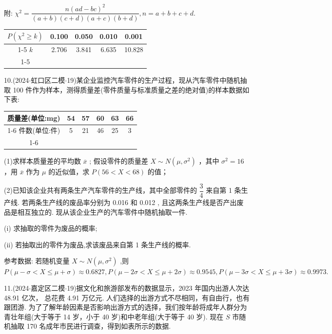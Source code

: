 附: ${\chi }^{2} = \dfrac{n{\left( ad - bc\right) }^{2}}{\left( {a + b}\right) \left( {c + d}\right) \left( {a + c}\right) \left( {b + d}\right) },n = a + b + c + d$.

\begin{center}

\begin{tabular}{|c|c|c|c|c|}
\hline
$P\left( {{\chi }^{2} \geq  k}\right)$ & 0.100 & 0.050 & 0.010 & 0.001 \\
\cline{1-5}
$k$ & 2.706 & 3.841 & 6.635 & 10.828 \\
\cline{1-5}
\hline
\end{tabular}
\end{center}

10.(2024$\cdot$虹口区二模$\cdot$19)某企业监控汽车零件的生产过程，现从汽车零件中随机抽取 100 件作为样本，测得质量差(零件质量与标准质量之差的绝对值)的样本数据如下表:

\begin{center}

\begin{tabular}{|c|c|c|c|c|c|}
\hline
质量差(单位:mg) & 54 & 57 & 60 & 63 & 66 \\
\cline{1-6}
件数(单位:件) & 5 & 21 & 46 & 25 & 3 \\
\cline{1-6}
\hline
\end{tabular}
\end{center}

(1)求样本质量差的平均数 $\overline{x}$ ; 假设零件的质量差 $X \sim  N\left( {\mu ,{\sigma }^{2}}\right)$ ，其中 ${\sigma }^{2} = {16}$ ，用 $\overline{x}$ 作为 $\mu$ 的近似值，求 $P\left( {{56} < X < {68}}\right)$ 的值；

(2)已知该企业共有两条生产汽车零件的生产线，其中全部零件的 $\dfrac{3}{4}$ 来自第 1 条生产线. 若两条生产线的废品率分别为 0.016 和 0.012 , 且这两条生产线是否产出废品是相互独立的. 现从该企业生产的汽车零件中随机抽取一件.

(i) 求抽取的零件为废品的概率;

(ii) 若抽取出的零件为废品,求该废品来自第 1 条生产线的概率.

参考数据: 若随机变量 $X \sim  N\left( {\mu ,{\sigma }^{2}}\right)$ ,则 $P\left( {\mu  - \sigma  < X \leq  \mu  + \sigma }\right)  \approx  {0.6827},P\left( {\mu  - {2\sigma } < X \leq  \mu  + {2\sigma }}\right)  \approx  {0.9545},P\left( {\mu  - {3\sigma } < X \leq  \mu  + {3\sigma }}\right)  \approx  {0.9973}.$

11.(2024$\cdot$嘉定区二模$\cdot$19)据文化和旅游部发布的数据显示，2023 年国内出游人次达 48.91 亿次， 总花费 4.91 万亿元. 人们选择的出游方式不尽相同，有自由行，也有跟团游. 为了了解年龄因素是否影响出游方式的选择，我们按年龄将成年人群分为青壮年组(大于等于 14 岁，小于 40 岁)和中老年组(大于等于 40 岁). 现在 $S$ 市随机抽取 170 名成年市民进行调查，得到如表所示的数据.

